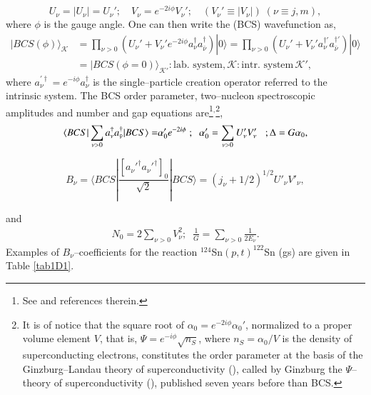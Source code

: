 \begin{equation}
U_\nu=|U_\nu|=U_\nu';\quad V_\nu=e^{-2i\phi}V_\nu';\quad(V_\nu'\equiv|V_\nu|)\;(\nu\equiv j,m),
\end{equation}
where $\phi$ is the gauge angle. One can then write the  (BCS) wavefunction as, 
\begin{equation}
\begin{split}
|BCS(\phi)\rangle_{\mathcal K}&=\prod_{\nu>0} \left(U_\nu'+V_\nu'e^{-2i\phi}a_\nu^\dagger a_{\bar{\nu}}^\dagger\right)|0\rangle=\prod_{\nu>0}\left(U_\nu'+V_\nu'a_\nu^{\dagger'} a_{\bar{\nu}}^{\dagger'}\right)|0\rangle\\
&=|BCS(\phi=0)\rangle_{\mathcal{K'}}:\text{lab. system},\mathcal{K}:\text{intr. system}\,\mathcal{K}',
\end{split}
\end{equation}
where $a_{\nu}^{'\dagger}=e^{-i\phi}a_{\nu}^{\dagger}$ is the single--particle creation operator referred to the intrinsic system.
The BCS  order parameter,  two--nucleon spectroscopic amplitudes and number and gap equations are\footnote{See \cite{Potel:17} and references therein.}$^{,}$\footnote{It is of notice that the square root of $\alpha_0=e^{-2i\phi}\alpha_0'$, normalized to a proper volume element $V$, that is, $\Psi=e^{-i\phi}\sqrt{n_S}$, where $n_S=\alpha_0/V$ is the density of superconducting electrons, constitutes the order parameter at the basis of the Ginzburg--Landau theory of superconductivity (\cite{Ginzburg:50}), called by Ginzburg the $\Psi$--theory of superconductivity (\cite{Ginzburg:04}), published seven years before than BCS.},
\begin{equation}
\begin{split}
\langle {BCS|\sum_{\nu>0}a^\dagger_\nu a^\dagger_{\bar\nu}|BCS} \rangle=&\alpha_0'e^{-2i\phi}\; ; \;\;\alpha_0'=\sum_{\nu>0}U_\nu'V_\nu' \;\;\;;\Delta=G\alpha_0,\\
\end{split}
\end{equation}


\begin{equation}
B_\nu=\langle BCS|\frac{[a_\nu'^\dagger a_\nu'^\dagger]_0}{\sqrt{2}}|BCS\rangle=(j_\nu+1/2)^{1/2}U'_\nu V'_\nu,
\end{equation}

and
\begin{equation}
\begin{split} N_0=2\sum_{\nu>0}V^2_\nu;\;\;\frac{1}{G}=\sum_{\nu>0}\frac{1}{2E_\nu}.
\end{split}
\end{equation}
Examples of $B_\nu$--coefficients for the reaction $^{124}$Sn$(p,t)^{122}$Sn (gs) are given in Table \ref{tab1D1}. 


